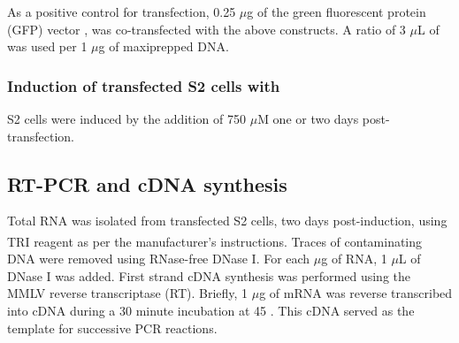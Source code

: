 As a positive control for transfection, 0.25 $\mu$g of the green fluorescent protein (GFP) vector \pucgfp, was co-transfected with the above constructs. A ratio of 3 $\mu$L of \transit was used per 1 $\mu$g of maxiprepped DNA.

\subsubsection{Induction of transfected S2 cells with \cuso}
\droso{} S2 cells were induced by the addition of 750 $\mu$M \cuso{} one or two days post-transfection.

\subsection{RT-PCR and cDNA synthesis} %
Total RNA was isolated from transfected S2 cells, two days post-induction, using TRI reagent\textsuperscript{\textregistered} as per the manufacturer's instructions. 
Traces of contaminating DNA were removed using RNase-free DNase I. 
For each $\mu$g of RNA, 1 $\mu$L of DNase I was added. First strand cDNA synthesis was performed using the MMLV reverse transcriptase (RT). Briefly, 1 $\mu$g of mRNA was reverse transcribed into cDNA during a 30 minute incubation at 45 \textcelsius{}. This cDNA served as the template for successive PCR reactions. 



